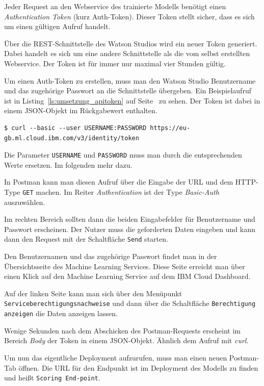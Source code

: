 Jeder Request an den Webservice des trainierte Modells benötigt einen \textit{Authentication Token} (kurz Auth-Token).
Dieser Token stellt sicher, dass es sich um einen gültigen Aufruf handelt.

Über die REST-Schnittstelle des Watson Studios wird ein neuer Token generiert. Dabei handelt es sich um eine andere
Schnittstelle als die vom selbst erstellten Webservice. Der Token ist für immer nur maximal vier Stunden gültig.

Um einen Auth-Token zu erstellen, muss man den Watson Studio Benutzername und das zugehörige Passwort an die
Schnittstelle übergeben. Ein Beispielaufruf ist in Listing~\ref{ls:umsetzung_apitoken} auf
Seite~\pageref{ls:umsetzung_apitoken} zu sehen. Der Token ist dabei in einem JSON-Objekt im Rückgabewert enthalten.

\begin{lstlisting}[caption=Abruf des Auth-Tokens, label=ls:umsetzung_apitoken]
$ curl --basic --user USERNAME:PASSWORD https://eu-gb.ml.cloud.ibm.com/v3/identity/token
\end{lstlisting}

Die Parameter \texttt{USERNAME} und \texttt{PASSWORD} muss man durch die entsprechenden Werte ersetzen. Im folgenden
mehr dazu.

In Postman kann man diesen Aufruf über die Eingabe der URL und dem HTTP-Type \texttt{GET} machen. Im Reiter
\textit{Authentication} ist der Type \textit{Basic-Auth} auszuwählen.

Im rechten Bereich sollten dann die beiden Eingabefelder für Benutzername und Passwort erscheinen. Der Nutzer muss die
geforderten Daten eingeben und kann dann den Request mit der Schaltfläche \texttt{Send} starten.

Den Benutzernamen und das zugehörige Passwort findet man in der Übersichtsseite des Machine Learning Services. Diese
Seite erreicht man über einen Klick auf den Machine Learning Service auf dem IBM Cloud Dashboard.

Auf der linken Seite kann man sich über den Menüpunkt \texttt{Service\-berechtigungs\-nachweise} und dann über die
Schaltfläche \texttt{Berechtigung anzeigen} die Daten anzeigen lassen.

Wenige Sekunden nach dem Abschicken des Postman-Requests erscheint im Bereich \textit{Body} der Token in einem
JSON-Objekt. Ähnlich dem Aufruf mit \textit{curl}.

Um nun das eigentliche Deployment aufzurufen, muss man einen neuen Postman-Tab öffnen. Die URL für den Endpunkt ist im
Deployment des Modells zu finden und heißt \texttt{Scoring End-point}.

